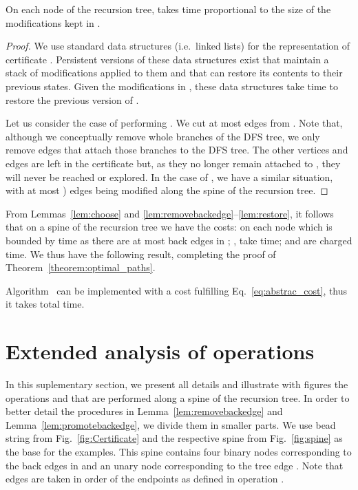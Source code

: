 \begin{lemma}
	\label{lem:restore} On each node of the recursion tree,
	 takes time proportional to the size of the
	modifications kept in .
\end{lemma}
\begin{proof}
	We use standard data structures (i.e.~linked lists) for the
        representation of certificate .  Persistent versions of
        these data structures exist that maintain a stack of
        modifications applied to them and that can restore its
        contents to their previous states.  Given the modifications in
        , these data structures take  time to restore the
        previous version of .

        Let us consider the case of performing . We
        cut at most  edges from . Note that, although we
        conceptually remove whole branches of the DFS tree, we only
        remove edges that attach those branches to the DFS tree. The
        other vertices and edges are left in the certificate but, as
        they no longer remain attached to , they will never
        be reached or explored. In the case of , we
        have a similar situation, with at most ) edges being
        modified along the spine of the recursion tree. 
\end{proof}


From Lemmas~\ref{lem:choose} and
\ref{lem:removebackedge}--\ref{lem:restore}, it follows that on a
spine of the recursion tree we have the costs:
 on each node which is bounded by  time as there
are at most  back edges in ; ,
 take  time;  and
 are charged  time.  We thus have the following
result,  completing the proof of Theorem~\ref{theorem:optimal_paths}.

\begin{lemma}
	\label{lem:algo_cost}
	Algorithm~ can be implemented with a
        cost fulfilling Eq.~\eqref{eq:abstrac_cost}, thus it takes
        total \mbox{} time.
\end{lemma}

\section{Extended analysis of operations}
\label{app:extend-analys-oper}

In this suplementary section, we present all details and illustrate
with figures the operations  and 
that are performed along a spine of the recursion tree. In order to
better detail the procedures in Lemma~\ref{lem:removebackedge} and
Lemma~\ref{lem:promotebackedge}, we divide them in smaller parts.  We
use bead string  from Fig.~\ref{fig:Certificate} and the
respective spine from Fig.~\ref{fig:spine} as the base for the
examples. This spine contains four binary nodes corresponding to the
back edges in  and an unary node corresponding to the tree edge
. Note that edges are taken in order of the endpoints
 as defined in operation .

